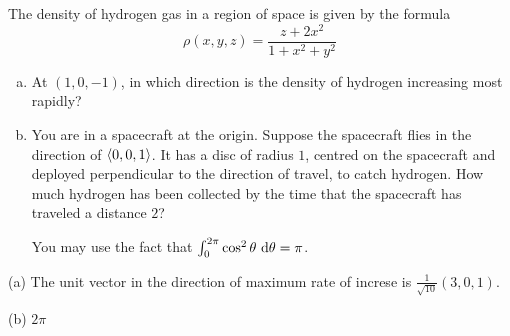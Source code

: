 \begin{question}[M200 2014D] %
The density of hydrogen gas in a region of space is given by the formula
\begin{equation*}
\rho(x,y,z) =\frac{z+2x^2}{1+x^2+y^2}
\end{equation*}
\begin{enumerate}[(a)]
\item
At $(1,0,-1)$, in which direction is the density of hydrogen increasing 
most rapidly?
\item
You are in a spacecraft at the origin. Suppose the spacecraft flies 
in the direction of $\left< 0,0,1\right>$. It has a disc of radius $1$, 
centred on the spacecraft and deployed perpendicular to the direction 
of travel, to catch hydrogen. How much hydrogen has been collected
by the time that the spacecraft has traveled a distance $2$? 

You may use the fact that $\int_0^{2\pi}\cos^2\theta\ \mathrm{d}\theta
=\pi$.
\end{enumerate}
\end{question}

%

\begin{answer}
(a) The unit vector in the direction of maximum rate of increse is $\frac{1}{\sqrt{10}}(3,0,1)$.

(b) $2\pi$
\end{answer}

